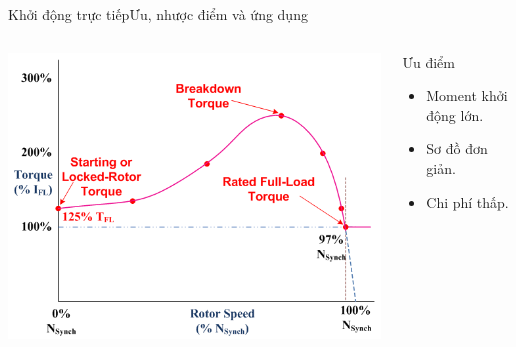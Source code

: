\documentclass[17pt]{beamer}
\begin{document}
\begin{frame}{Khởi động trực tiếp}{Ưu, nhược điểm và ứng dụng}
	\vspace{-1cm}
	\begin{columns}
		\begin{center}
			\includegraphics[scale=.5]{images-chude1/moment-tocdo.png} 
		\end{center}
		
		\begin{block}{Ưu điểm}
			\begin{itemize}
				\item Moment khởi động lớn.
				\item Sơ đồ đơn giản.
				\item Chi phí thấp.
			\end{itemize}
		\end{block}
	\end{columns}
\end{frame}
\end{document}
